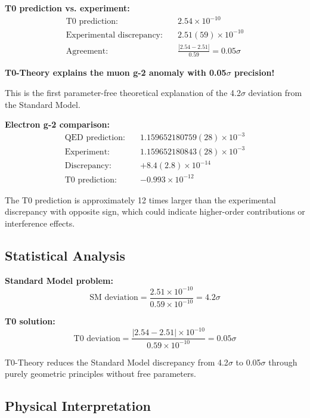 \documentclass[12pt,a4paper]{article}
\begin{document}
\textbf{T0 prediction vs. experiment:}
\begin{align}
	\text{T0 prediction:} \quad &2.54 \times 10^{-10}\\
	\text{Experimental discrepancy:} \quad &2.51(59) \times 10^{-10}\\
	\text{Agreement:} \quad &\frac{|2.54 - 2.51|}{0.59} = 0.05\sigma
\end{align}


	\textbf{T0-Theory explains the muon g-2 anomaly with 0.05$\sigma$ precision!}
	
	This is the first parameter-free theoretical explanation of the 4.2$\sigma$ deviation from the Standard Model.


\textbf{Electron g-2 comparison:}
\begin{align}
	\text{QED prediction:} \quad &1.159652180759(28) \times 10^{-3}\\
	\text{Experiment:} \quad &1.159652180843(28) \times 10^{-3}\\
	\text{Discrepancy:} \quad &+8.4(2.8) \times 10^{-14}\\
	\text{T0 prediction:} \quad &-0.993 \times 10^{-12}
\end{align}

The T0 prediction is approximately 12 times larger than the experimental discrepancy with opposite sign, which could indicate higher-order contributions or interference effects.

\subsection{Statistical Analysis}

\textbf{Standard Model problem:}
\begin{equation}
	\text{SM deviation} = \frac{2.51 \times 10^{-10}}{0.59 \times 10^{-10}} = 4.2\sigma
\end{equation}

\textbf{T0 solution:}
\begin{equation}
	\text{T0 deviation} = \frac{|2.54 - 2.51| \times 10^{-10}}{0.59 \times 10^{-10}} = 0.05\sigma
\end{equation}

T0-Theory reduces the Standard Model discrepancy from 4.2$\sigma$ to 0.05$\sigma$ through purely geometric principles without free parameters.

\subsection{Physical Interpretation}
\end{document}
